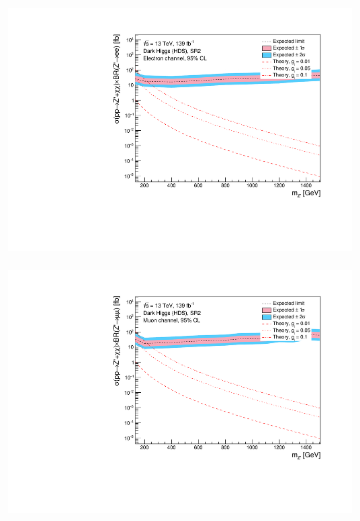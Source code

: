 \documentclass[12pt, a4paper]{book}
\begin{document}
\begin{figure}[!ht]
\begin{subfigure}[b]{0.49\textwidth}
   \end{subfigure}
   \hfill
   \begin{subfigure}[b]{0.49\textwidth}
      \centering
      \includegraphics[width=1\textwidth]{Limits/Model_independent/100-150/DH_HDS/mass_exclusion_ee.pdf}
   \end{subfigure}
   \hfill
   \begin{subfigure}[b]{0.49\textwidth}
      \centering
      \includegraphics[width=1\textwidth]{Limits/Model_independent/100-150/DH_HDS/mass_exclusion_uu.pdf}
   \end{subfigure}
   \hfill
	\begin{subfigure}[b]{0.49\textwidth}
      \centering

\end{subfigure}
\end{figure}
\end{document}

